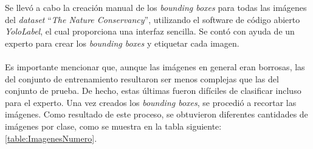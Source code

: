 Se llevó a cabo la creación manual de los \textit{bounding boxes} para todas las imágenes del \textit{dataset} ``\textit{The Nature Conservancy}'', utilizando el software de código abierto \textit{YoloLabel}, el cual proporciona una interfaz sencilla. Se contó con ayuda de un experto para crear los \textit{bounding boxes} y etiquetar cada imagen.
\\\\
Es importante mencionar que, aunque las imágenes en general eran borrosas, las del conjunto de entrenamiento resultaron ser menos complejas que las del conjunto de prueba. De hecho, estas últimas fueron difíciles de clasificar incluso para el experto. Una vez creados los \textit{bounding boxes}, se procedió a recortar las imágenes. Como resultado de este proceso, se obtuvieron diferentes cantidades de imágenes por clase, como se muestra en la tabla siguiente:\ref{table:ImagenesNumero}.
\\
